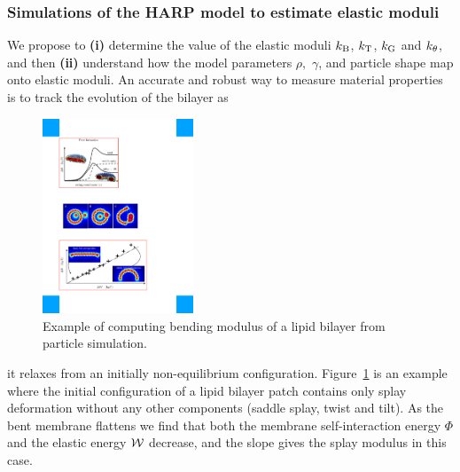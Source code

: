 \subsubsection{Simulations of the HARP model to estimate elastic moduli}
We propose to
%
%
%
{\bf (i)} determine the value of the elastic moduli $k_{\mathrm{B}}$,
$k_{\mathrm{T}}$, $k_{\mathrm{G}}$ and $k_{\theta}$, and then {\bf (ii)} understand how the model parameters $\rho,$ $\gamma$, and particle shape map onto elastic moduli. 
An accurate and robust way to measure material properties is to track the evolution of the bilayer as
%
\begin{figure}
\vspace{-0.3cm}
\centerline{\includegraphics[width=0.4\textwidth]{Figures/Flattening.pdf}}
\vspace{-0.2cm}
\caption{\label{fig:flattening}Example of computing bending modulus of a lipid bilayer from particle simulation.
    }
\end{figure}
it relaxes from an initially non-equilibrium configuration.
Figure~\ref{fig:flattening} is an example where the initial configuration of a lipid bilayer patch contains only splay deformation without any other components (saddle splay, twist and tilt). 
As the bent membrane flattens we find that both the membrane self-interaction energy $\Phi$ and the elastic energy ${\cal W}$ decrease, and the slope gives the
splay modulus in this case. 


